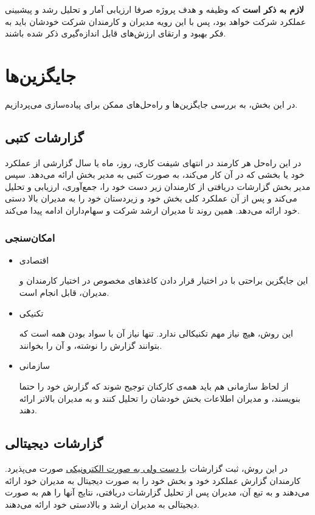 \documentclass[12pt, dvipsnames, svgnames, x11names,]{article}
\begin{document}
\textbf{لازم به ذکر است}
که وظیفه و هدف پروژه صرفا ارزیابی آمار و تحلیل رشد و پیشبینی عملکرد شرکت خواهد بود، پس با این رویه مدیران و کارمندان شرکت خودشان باید به فکر بهبود و ارتقای ارزش‌های قابل اندازه‌گیری ذکر شده باشند.


\section{جایگزین‌ها}
در این بخش، به بررسی جایگزین‌ها و راه‌حل‌های ممکن برای پیاده‌سازی  می‌پردازیم.

\subsection{گزارشات کتبی }\label{written-report}
در این راه‌حل هر کارمند در انتهای شیفت کاری، روز، ماه یا سال گزارشی از عملکرد خود یا بخشی که در آن کار می‌کند، به صورت کتبی به مدیر بخش ارائه می‌دهد. سپس مدیر بخش گزارشات دریافتی از کارمندان زیر دست خود را، جمع‌آوری، ارزیابی و تحلیل می‌کند و پس از آن عملکرد کلی بخش خود و زیردستان خود را به مدیران بالا دستی خود ارائه می‌دهد.
همین روند تا مدیران ارشد شرکت و سهام‌داران ادامه پیدا می‌کند.

\subsubsection{امکان‌سنجی}
    \begin{itemize}
        \item 
        اقتصادی
        
        این جایگزین براحتی با در اختیار قرار دادن کاغذ‌های مخصوص در اختیار کارمندان و مدیران، قابل انجام است.
        \item 
        تکنیکی
        
        این روش، هیچ نیاز مهم تکنیکالی ندارد. تنها نیاز آن با سواد بودن همه است که بتوانند گزارش را نوشته، و آن را بخوانند.
        \item 
        سازمانی
        
        از لحاظ سازمانی هم باید همه‌ی کارکنان توجیح شوند که گزارش خود را حتما بنویسند، و مدیران اطلاعات بخش خودشان را تحلیل کنند و به مدیران بالاتر ارائه دهند.
    \end{itemize}


\subsection{گزارشات دیجیتالی }\label{half-digital}
در این روش، ثبت گزارشات \underline{با دست ولی به صورت الکترونیکی} صورت می‌پذیرد.
کارمندان گزارش عملکرد خود و بخش خود را به صورت دیجیتال به مدیران خود ارائه می‌دهند و به تبع آن، مدیران پس از تحلیل گزارشات دریافتی، نتایج آنها را هم به صورت دیجیتالی به مدیران ارشد و بالادستی خود ارائه می‌دهند.
\end{document}
